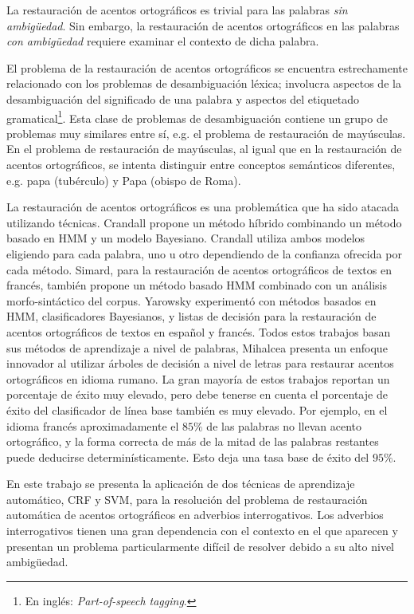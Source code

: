 \documentclass[runningheads,a4paper]{llncs}
\begin{document}
La restauración de acentos ortográficos es trivial para las palabras \emph{sin ambig\"uedad}. Sin embargo, la restauración de acentos ortográficos en las palabras \emph{con ambig\"uedad} requiere examinar el contexto de dicha palabra. 

El problema de la restauración de acentos ortográficos se encuentra estrechamente relacionado con los problemas de desambiguación léxica; involucra aspectos de la desambiguación del significado de una palabra y aspectos del etiquetado gramatical\footnote{En inglés: \emph{Part-of-speech tagging}.}. Esta clase de problemas de desambiguación contiene un grupo de problemas muy similares entre sí, e.g. el problema de restauración de mayúsculas. En el problema de restauración de mayúsculas, al igual que en la restauración de acentos ortográficos, se intenta distinguir entre conceptos semánticos diferentes, e.g. papa (tubérculo) y Papa (obispo de Roma).

La restauración de acentos ortográficos es una problemática que ha sido atacada utilizando técnicas. Crandall\cite{CRANDALL95} propone un método híbrido combinando un método basado en HMM y un modelo Bayesiano. Crandall utiliza ambos modelos eligiendo para cada palabra, uno u otro dependiendo de la confianza ofrecida por cada método. Simard\cite{SIMARD98}, para la restauración de acentos ortográficos de textos en francés, también propone un método basado HMM combinado con un análisis morfo-sintáctico del corpus. Yarowsky\cite{YAROWSKY94,YAROWSKY94-2} experimentó con métodos basados en HMM, clasificadores Bayesianos, y listas de decisión para la restauración de acentos ortográficos de textos en español y francés. Todos estos trabajos basan sus métodos de aprendizaje a nivel de palabras, Mihalcea\cite{MIHALCEA02} presenta un enfoque innovador al utilizar árboles de decisión a nivel de letras para restaurar acentos ortográficos en idioma rumano. La gran mayoría de estos trabajos reportan un porcentaje de éxito muy elevado, pero debe tenerse en cuenta el porcentaje de éxito del clasificador de línea base también es muy elevado. Por ejemplo, en el idioma francés aproximadamente el $85\%$ de las palabras no llevan acento ortográfico, y la forma correcta de más de la mitad de las palabras restantes puede deducirse determinísticamente. Esto deja una tasa base de éxito del $95\%$\cite{SIMARD98}.

En este trabajo se presenta la aplicación de dos técnicas de aprendizaje automático, CRF y SVM, para la resolución del problema de restauración automática de acentos ortográficos en adverbios interrogativos. Los adverbios interrogativos tienen una gran dependencia con el contexto en el que aparecen y presentan un problema particularmente difícil de resolver debido a su alto nivel ambigüedad.
\end{document}
